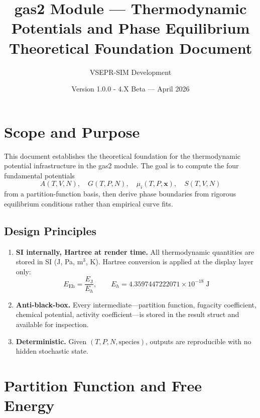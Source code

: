 \documentclass[11pt]{article}
\title{\textbf{gas2 Module --- Thermodynamic Potentials and Phase Equilibrium} \\
\Large Theoretical Foundation Document}
\author{VSEPR-SIM Development}
\date{Version 1.0.0 - 4.X Beta --- April 2026}
\begin{document}
\maketitle
\tableofcontents
\newpage

\section{Scope and Purpose}

This document establishes the theoretical foundation for the thermodynamic
potential infrastructure in the gas2 module.  The goal is to compute
the four fundamental potentials
\[
  A(T,V,N), \quad G(T,P,N), \quad \mu_i(T,P,\mathbf{x}), \quad S(T,V,N)
\]
from a partition-function basis, then derive phase boundaries from rigorous
equilibrium conditions rather than empirical curve fits.

\subsection{Design Principles}

\begin{enumerate}
  \item \textbf{SI internally, Hartree at render time.}
        All thermodynamic quantities are stored in SI (J, Pa, m$^3$, K).
        Hartree conversion is applied at the display layer only:
        \[
          E_\mathrm{Eh} = \frac{E_\mathrm{J}}{E_h}, \qquad
          E_h = 4.3597447222071 \times 10^{-18}\;\mathrm{J}
        \]

  \item \textbf{Anti-black-box.}
        Every intermediate---partition function, fugacity coefficient,
        chemical potential, activity coefficient---is stored in the result
        struct and available for inspection.

  \item \textbf{Deterministic.}
        Given $(T, P, N, \text{species})$, outputs are reproducible
        with no hidden stochastic state.
\end{enumerate}


\section{Partition Function and Free Energy}
\end{document}
